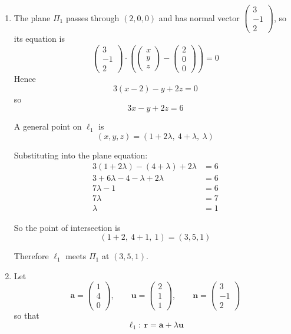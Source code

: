 \documentclass[leqno]{article}
\begin{document}
\begin{enumerate}[
  label=\textbf{\arabic*.},
  leftmargin=*,
  topsep=0pt,
  partopsep=0pt,
  parsep=0pt
]
\vspace*{30pt}

\begin{tcolorbox}[colback=white, colframe=scarlet, title={\textbf{Solution}}, breakable, grow to left by=6mm, grow to right by=10mm]
\begin{enumerate}[label=\textbf{(\alph*)}]
  \item The plane $\Pi_1$ passes through $(2,0,0)$ and has normal vector $\begin{pmatrix}3\\-1\\2\end{pmatrix}$, so its equation is
\[
\begin{pmatrix}3\\-1\\2\end{pmatrix}\cdot
\left(
\begin{pmatrix}x\\y\\z\end{pmatrix}
-
\begin{pmatrix}2\\0\\0\end{pmatrix}
\right)=0
\]
Hence
\[
3(x-2)-y+2z=0
\]
so
\[
3x-y+2z=6
\]

A general point on $\ell_1$ is
\[
(x,y,z)=(1+2\lambda,\ 4+\lambda,\ \lambda)
\]

Substituting into the plane equation:
\begin{align*}
3(1+2\lambda)-(4+\lambda)+2\lambda&=6\\
3+6\lambda-4-\lambda+2\lambda&=6\\
7\lambda-1&=6\\
7\lambda&=7\\
\lambda&=1
\end{align*}

So the point of intersection is
\[
(1+2,\ 4+1,\ 1)=(3,5,1)
\]

Therefore $\ell_1$ meets $\Pi_1$ at $(3,5,1)$.

  \item Let
\[
\mathbf a=\begin{pmatrix}1\\4\\0\end{pmatrix},
\qquad
\mathbf u=\begin{pmatrix}2\\1\\1\end{pmatrix},
\qquad
\mathbf n=\begin{pmatrix}3\\-1\\2\end{pmatrix}
\]
so that
\[
\ell_1:\ \mathbf r=\mathbf a+\lambda \mathbf u
\]


\end{enumerate}
\end{tcolorbox}
\end{enumerate}
\end{document}
